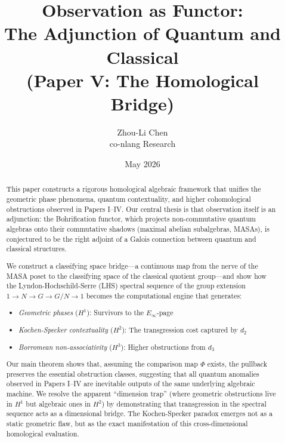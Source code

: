 \documentclass[11pt]{article}
\begin{document}
\title{Observation as Functor:\\
The Adjunction of Quantum and Classical\\
{\large (Paper V: The Homological Bridge)}}

\author{Zhou-Li Chen \\ co-nlang Research}
\date{May 2026}

\maketitle

\begin{abstract}
This paper constructs a rigorous homological algebraic framework that unifies the geometric phase phenomena, quantum contextuality, and higher cohomological obstructions observed in Papers I--IV. Our central thesis is that observation itself is an adjunction: the Bohrification functor, which projects non-commutative quantum algebras onto their commutative shadows (maximal abelian subalgebras, MASAs), is conjectured to be the right adjoint of a Galois connection between quantum and classical structures.

We construct a classifying space bridge---a continuous map from the nerve of the MASA poset to the classifying space of the classical quotient group---and show how the Lyndon-Hochschild-Serre (LHS) spectral sequence of the group extension $1 \to N \to G \to G/N \to 1$ becomes the computational engine that generates:
\begin{itemize}
\item \emph{Geometric phases} ($H^1$): Survivors to the $E_\infty$-page
\item \emph{Kochen-Specker contextuality} ($H^2$): The transgression cost captured by $d_2$
\item \emph{Borromean non-associativity} ($H^3$): Higher obstructions from $d_3$
\end{itemize}

Our main theorem shows that, assuming the comparison map $\Phi$ exists, the pullback preserves the essential obstruction classes, suggesting that all quantum anomalies observed in Papers I--IV are inevitable outputs of the same underlying algebraic machine. We resolve the apparent ``dimension trap'' (where geometric obstructions live in $H^1$ but algebraic ones in $H^2$) by demonstrating that transgression in the spectral sequence acts as a dimensional bridge. The Kochen-Specker paradox emerges not as a static geometric flaw, but as the exact manifestation of this cross-dimensional homological evaluation.
\end{abstract}
\end{document}
